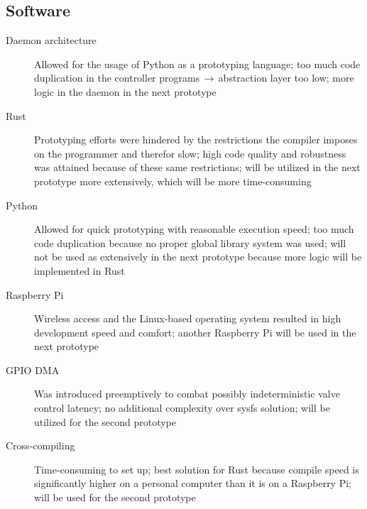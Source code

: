 \subsection{Software}
\author{Philip Trauner}

\begin{description}
\item [Daemon architecture] Allowed for the usage of Python as a prototyping language; too much code duplication in the controller programs$\,\to\,$abstraction layer too low; more logic in the daemon in the next prototype
\item [Rust] Prototyping efforts were hindered by the restrictions the compiler imposes on the programmer and therefor slow; high code quality and robustness was attained because of these same restrictions; will be utilized in the next prototype more extensively, which will be more time-consuming
\item [Python] Allowed for quick prototyping with reasonable execution speed; too much code duplication because no proper global library system was used; will not be used as extensively in the next prototype because more logic will be implemented in Rust
\item [Raspberry Pi] Wireless access and the Linux-based operating system resulted in high development speed and comfort; another Raspberry Pi will be used in the next prototype
\item [GPIO DMA] Was introduced preemptively to combat possibly indeterministic valve control latency; no additional complexity over sysfs solution; will be utilized for the second prototype 
\item [Cross-compiling] Time-consuming to set up; best solution for Rust because compile speed is significantly higher on a personal computer than it is on a Raspberry Pi; will be used for the second prototype 
\end{description}

